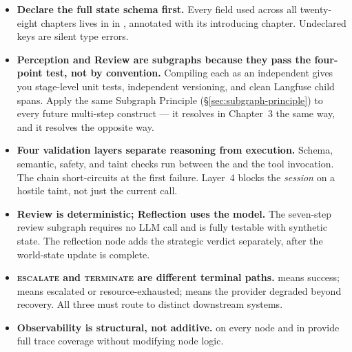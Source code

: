\begin{takeawaybox}
\begin{itemize}
  \item \textbf{Declare the full state schema first.}  Every field used
        across all twenty-eight chapters lives in  in
        , annotated with its introducing chapter.
        Undeclared keys are silent type errors.

  \item \textbf{Perception and Review are subgraphs because they pass the
        four-point test, not by convention.}  Compiling each as an
        independent  gives you stage-level unit tests,
        independent versioning, and clean Langfuse child spans.  Apply
        the same Subgraph Principle (§\ref{sec:subgraph-principle}) to
        every future multi-step construct --- it resolves
         in Chapter~3 the same way, and it
        resolves  the opposite way.

  \item \textbf{Four validation layers separate reasoning from execution.}
        Schema, semantic, safety, and taint checks run between the
         and the tool invocation.  The chain short-circuits
        at the first failure.  Layer~4 blocks the \emph{session} on a
        hostile taint, not just the current call.

  \item \textbf{Review is deterministic; Reflection uses the model.}
        The seven-step review subgraph requires no LLM call and is fully
        testable with synthetic state.  The reflection node adds the
        strategic verdict separately, after the world-state update is
        complete.

  \item \textbf{\textsc{escalate} and \textsc{terminate} are different
        terminal paths.}   means success; 
        means escalated or resource-exhausted;  means the
        provider degraded beyond recovery.  All three must route to distinct
        downstream systems.

  \item \textbf{Observability is structural, not additive.}  
        on every node and  in
         provide full trace coverage without
        modifying node logic.
\end{itemize}
\end{takeawaybox}
